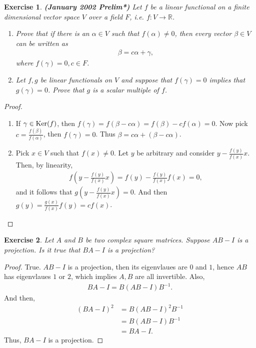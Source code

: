 \documentclass[11pt]{book}
\newtheorem{exercise}{Exercise}[section]
\theoremstyle{definition}
\numberwithin{equation}{subsection}
\begin{document}
\begin{exercise}{\bf (January 2002 Prelim*)}
Let $f$ be a linear functional on a finite dimensional vector space $V$ over a field $F$, i.e. $f: V \to \mathbb{R}$.
\begin{enumerate}[label=(\alph*)]
    \item Prove that if there is an $\alpha \in V$ such that $f(\alpha) \neq 0$, then every vector $\beta \in V$ can be written as 
    \begin{align*}
        \beta = c \alpha + \gamma, 
    \end{align*}
    where $f(\gamma) = 0, c \in F$.
    
    \item Let $f, g$ be linear functionals on $V$ and suppose that $f(\gamma) = 0$ implies that $g(\gamma) = 0$. Prove that $g$ is a scalar multiple of $f$.
\end{enumerate}
\end{exercise}
\begin{proof}
~\begin{enumerate}[label=(\alph*)]
    \item If $\gamma \in {\rm Ker} (f)$, then $f(\gamma) = f(\beta - c \alpha) = f(\beta) - c f(\alpha) = 0$. Now pick $c = \frac{f(\beta)}{f(\alpha)}$, then $f(\gamma) = 0$. Thus $\beta = c \alpha + (\beta - c \alpha)$.
    
    \item Pick $x \in V$ such that $f(x) \neq 0$. Let $y$ be arbitrary and consider $y - \frac{f(y)}{f(x)}x$. Then, by linearity,
    \begin{align*}
        f \left(y - \frac{f(y)}{f(x)}x \right) = f(y) - \frac{f(y)}{f(x)}f(x) = 0,
    \end{align*}
    and it follows that $g \left(y - \frac{f(y)}{f(x)}x \right) = 0$. And then $g(y) = \frac{g(x)}{f(x)}f(y) = c f(x)$\cite{11}.
\end{enumerate}
\end{proof}

\medskip

\begin{exercise}{\bf *}
Let $A$ and $B$ be two complex square matrices. Suppose $AB - I$ is a projection. Is it true that $BA - I$ is a projection?
\end{exercise}
\begin{proof}
True. $AB - I$ is a projection, then its eigenvlaues are $0$ and $1$, hence $AB$ has eigenvlaues $1$ or $2$, which implies $A,B$ are all invertible. Also, 
\begin{align*}
    BA - I = B\left(AB - I\right) B^{-1}.
\end{align*}
And then,
\begin{align*}
    (BA - I)^2 & = B\left(AB - I\right)^2 B^{-1} \\
    & = B\left(AB - I\right) B^{-1} \\
    & = BA - I.
\end{align*}
Thus, $BA - I$ is a projection.
\end{proof}
\end{document}
